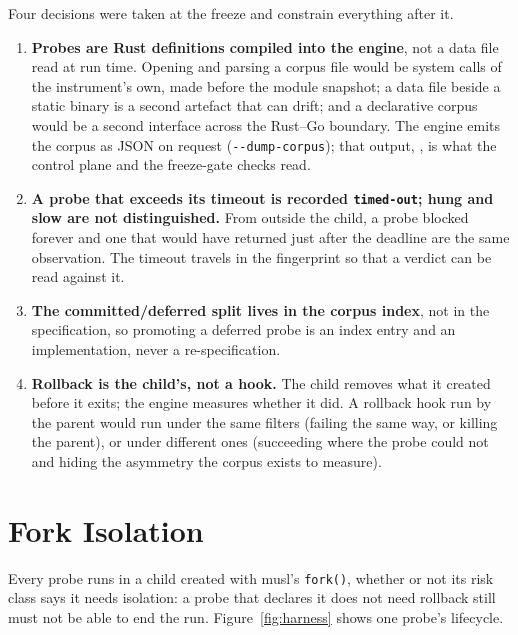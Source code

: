 Four decisions were taken at the freeze and constrain everything after it.
\begin{enumerate}[leftmargin=*]
\item \textbf{Probes are Rust definitions compiled into the engine}, not a data file read at run time. Opening and parsing a corpus file would be system calls of the instrument's own, made before the module snapshot; a data file beside a static binary is a second artefact that can drift; and a declarative corpus would be a second interface across the Rust--Go boundary. The engine emits the corpus as JSON on request (\texttt{-{}-dump-corpus}); that output, , is what the control plane and the freeze-gate checks read.
\item \textbf{A probe that exceeds its timeout is recorded \texttt{timed-out}; hung and slow are not distinguished.} From outside the child, a probe blocked forever and one that would have returned just after the deadline are the same observation. The timeout travels in the fingerprint so that a verdict can be read against it.
\item \textbf{The committed/deferred split lives in the corpus index}, not in the specification, so promoting a deferred probe is an index entry and an implementation, never a re-specification.
\item \textbf{Rollback is the child's, not a hook.} The child removes what it created before it exits; the engine measures whether it did. A rollback hook run by the parent would run under the same filters (failing the same way, or killing the parent), or under different ones (succeeding where the probe could not and hiding the asymmetry the corpus exists to measure).
\end{enumerate}

\section{Fork Isolation}
\label{sec:engine}

Every probe runs in a child created with musl's \texttt{fork()}, whether or not its risk class says it needs isolation: a probe that declares it does not need rollback still must not be able to end the run. Figure~\ref{fig:harness} shows one probe's lifecycle.

